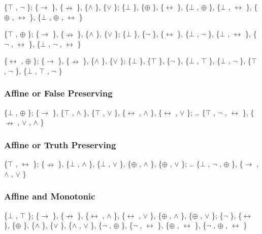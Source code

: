 \{$\top$ , $\neg$ \}; \{$\to$ \}, \{$\nrightarrow$ \}, \{$\land$ \}, \{$\lor$ \}; \{$\bot$ \}, \{$\oplus$ \}, \{$\leftrightarrow$ \}, \{$\bot$ , $\oplus$ \},
\{$\bot$ , $\leftrightarrow$ \}, \{$\oplus$ , $\leftrightarrow$ \}, \{$\bot$ , $\oplus$ , $\leftrightarrow$ \}

\{$\top$ , $\oplus$ \}; \{$\to$ \}, \{$\nrightarrow$ \}, \{$\land$ \}, \{$\lor$ \}; \{$\bot$ \}, \{$\neg$ \}, \{$\leftrightarrow$ \}, \{$\bot$ , $\neg$ \},
\{$\bot$ , $\leftrightarrow$ \}, \{$\neg$ , $\leftrightarrow$ \}, \{$\bot$ , $\neg$ , $\leftrightarrow$ \}

\{$\leftrightarrow$ , $\oplus$ \}; \{$\to$ \}, \{$\nrightarrow$ \}, \{$\land$ \}, \{$\lor$ \}; \{$\bot$ \}, \{$\top$ \}, \{$\neg$ \}, \{$\bot$ , $\top$ \},
\{$\bot$ , $\neg$ \}, \{$\top$ , $\neg$ \}, \{$\bot$ , $\top$ , $\neg$ \}

\hypertarget{affine-or-false-preserving}{%
\subsubsection{Affine or False
Preserving}\label{affine-or-false-preserving}}

\{$\bot$ , $\oplus$ \}; \{$\to$ \}, \{$\top$ , $\land$ \}, \{$\top$ , $\lor$ \}, \{$\leftrightarrow$ , $\land$ \}, \{$\leftrightarrow$ , $\lor$ \}; \ldots{} \{$\top$ ,
$\neg$ , $\leftrightarrow$ \}, \{$\nrightarrow$ , $\lor$ , $\land$ \}

\hypertarget{affine-or-truth-preserving}{%
\subsubsection{Affine or Truth
Preserving}\label{affine-or-truth-preserving}}

\{$\top$ , $\leftrightarrow$ \}; \{$\nrightarrow$ \}, \{$\bot$ , $\land$ \}, \{$\bot$ , $\lor$ \}, \{$\oplus$ , $\land$ \}, \{$\oplus$ , $\lor$ \}; \ldots{} \{$\bot$ ,
$\neg$ , $\oplus$ \}, \{$\to$ , $\land$ , $\lor$ \}

\hypertarget{affine-and-monotonic}{%
\subsubsection{Affine and Monotonic}\label{affine-and-monotonic}}

\{$\bot$ , $\top$ \}; \{$\to$ \}, \{$\nrightarrow$ \}, \{$\leftrightarrow$ , $\land$ \}, \{$\leftrightarrow$ , $\lor$ \}, \{$\oplus$ , $\land$ \}, \{$\oplus$ , $\lor$ \}; \{$\neg$ \},
\{$\leftrightarrow$ \}, \{$\oplus$ \}, \{$\land$ \}, \{$\lor$ \}, \{$\land$ , $\lor$ \}, \{$\neg$ , $\oplus$ \}, \{$\neg$ , $\leftrightarrow$ \}, \{$\oplus$ , $\leftrightarrow$ \}, \{$\neg$ ,
$\oplus$ , $\leftrightarrow$ \}

